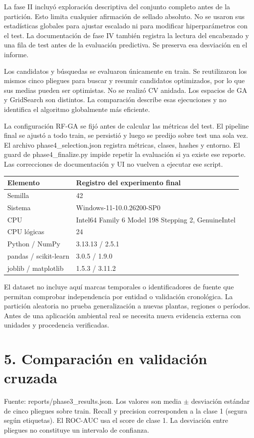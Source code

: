 \documentclass[12pt,a4paper]{article}
\begin{document}
La fase II incluyó exploración descriptiva del conjunto completo antes de la partición. Esto limita cualquier afirmación de sellado absoluto. No se usaron sus estadísticas globales para ajustar escalado ni para modificar hiperparámetros con el test. La documentación de fase IV también registra la lectura del encabezado y una fila de test antes de la evaluación predictiva. Se preserva esa desviación en el informe.

Los candidatos y búsquedas se evaluaron únicamente en train. Se reutilizaron los mismos cinco pliegues para buscar y resumir candidatos optimizados, por lo que sus medias pueden ser optimistas. No se realizó CV anidada. Los espacios de GA y GridSearch son distintos. La comparación describe esas ejecuciones y no identifica el algoritmo globalmente más eficiente.

La configuración RF-GA se fijó antes de calcular las métricas del test. El pipeline final se ajustó a todo train, se persistió y luego se predijo sobre test una sola vez. El archivo phase4\_selection.json registra métricas, clases, hashes y entorno. El guard de phase4\_finalize.py impide repetir la evaluación si ya existe ese reporte. Las correcciones de documentación y UI no vuelven a ejecutar ese script.

{\small\begin{tabularx}{\textwidth}{XX}
\toprule
Elemento & Registro del experimento final \\
\midrule
Semilla & 42 \\
Sistema & Windows-11-10.0.26200-SP0 \\
CPU & Intel64 Family 6 Model 198 Stepping 2, GenuineIntel \\
CPU lógicas & 24 \\
Python / NumPy & 3.13.13 / 2.5.1 \\
pandas / scikit-learn & 3.0.5 / 1.9.0 \\
joblib / matplotlib & 1.5.3 / 3.11.2 \\
\bottomrule\end{tabularx}}

El dataset no incluye aquí marcas temporales o identificadores de fuente que permitan comprobar independencia por entidad o validación cronológica. La partición aleatoria no prueba generalización a nuevas plantas, regiones o períodos. Antes de una aplicación ambiental real se necesita nueva evidencia externa con unidades y procedencia verificadas.

\clearpage
\section*{5. Comparación en validación cruzada}
Fuente: reports/phase3\_results.json. Los valores son media $\pm$ desviación estándar de cinco pliegues sobre train. Recall y precision corresponden a la clase 1 (segura según etiquetas). El ROC-AUC usa el score de clase 1. La desviación entre pliegues no constituye un intervalo de confianza.
\end{document}
